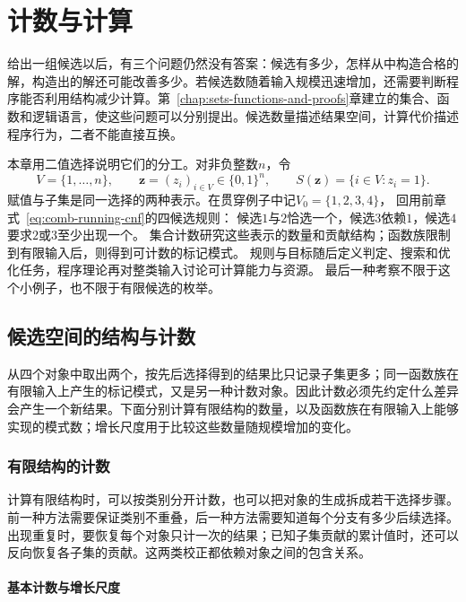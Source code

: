 \chapter{计数与计算}
\label{chap:combinatorics}

给出一组候选以后，有三个问题仍然没有答案：候选有多少，怎样从中构造合格的解，构造出的解还可能改善多少。若候选数随着输入规模迅速增加，还需要判断程序能否利用结构减少计算。第~\ref{chap:sets-functions-and-proofs}章建立的集合、函数和逻辑语言，使这些问题可以分别提出。候选数量描述结果空间，计算代价描述程序行为，二者不能直接互换。

本章用二值选择说明它们的分工。对非负整数$n$，令
\[
  V=\{1,\ldots,n\},\qquad
  \bm z=(z_i)_{i\in V}\in\{0,1\}^n,\qquad
  S(\bm z)=\{i\in V:z_i=1\}.
\]
赋值与子集是同一选择的两种表示。在贯穿例子中记$V_0=\{1,2,3,4\}$，
回用前章式~\eqref{eq:comb-running-cnf}的四候选规则：
候选$1$与$2$恰选一个，候选$3$依赖$1$，候选$4$要求$2$或$3$至少出现一个。
集合计数研究这些表示的数量和贡献结构；函数族限制到有限输入后，则得到可计数的标记模式。
规则与目标随后定义判定、搜索和优化任务，程序理论再对整类输入讨论可计算能力与资源。
最后一种考察不限于这个小例子，也不限于有限候选的枚举。

\section{候选空间的结构与计数}
\label{sec:comb-families-counting}

从四个对象中取出两个，按先后选择得到的结果比只记录子集更多；同一函数族在有限输入上产生的标记模式，又是另一种计数对象。因此计数必须先约定什么差异会产生一个新结果。下面分别计算有限结构的数量，以及函数族在有限输入上能够实现的模式数；增长尺度用于比较这些数量随规模增加的变化。

\subsection{有限结构的计数}
\label{sec:comb-finite-counting}

计算有限结构时，可以按类别分开计数，也可以把对象的生成拆成若干选择步骤。前一种方法需要保证类别不重叠，后一种方法需要知道每个分支有多少后续选择。出现重复时，要恢复每个对象只计一次的结果；已知子集贡献的累计值时，还可以反向恢复各子集的贡献。这两类校正都依赖对象之间的包含关系。

\subsubsection{基本计数与增长尺度}
\label{sec:comb-growth-scales}


